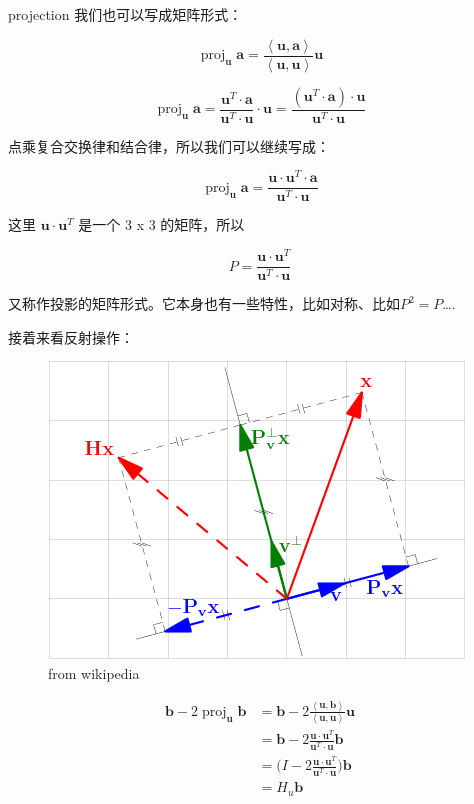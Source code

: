 \documentclass[
]{book}
\begin{document}
projection 我们也可以写成矩阵形式：

\[\operatorname {proj} _{\mathbf {u} }\mathbf {a} ={\frac {\left\langle \mathbf {u} ,\mathbf {a} \right\rangle }{\left\langle \mathbf {u} ,\mathbf {u} \right\rangle }}{\mathbf {u} }\]

\[
\operatorname {proj} _{\mathbf {u} }\mathbf {a} = {\frac  {\mathbf {u}^T \cdot \mathbf {a} }{\mathbf {u}^T \cdot \mathbf {u} }} \cdot  {\mathbf {u} }  =  {\frac  { (\mathbf {u}^T \cdot \mathbf {a})  \cdot \mathbf {u}  }{\mathbf {u}^T \cdot \mathbf {u} }}
\]

点乘复合交换律和结合律，所以我们可以继续写成：

\[
\operatorname {proj} _{\mathbf {u} }\mathbf {a} =  {\frac  { \mathbf {u}\cdot \mathbf {u}^T  \cdot \mathbf {a}  }{\mathbf {u}^T \cdot \mathbf {u} }}
\]

这里 \(\mathbf {u}\cdot \mathbf {u}^T\) 是一个 3 x 3 的矩阵，所以

\[
P =  {\frac  { \mathbf {u}\cdot \mathbf {u}^T  }{\mathbf {u}^T \cdot \mathbf {u} }}
\]

又称作投影的矩阵形式。它本身也有一些特性，比如对称、比如\(P^2 = P\)\ldots.

接着来看反射操作：

\begin{figure}
\centering
\includegraphics{images/QR_02_HouseholderReflection.png}
\caption{from wikipedia}
\end{figure}

\[
\begin{aligned}
\mathbf {b} - 2 \operatorname {proj} _{\mathbf {u} }\mathbf {b} {}
&= \mathbf {b} - 2 {\frac {\left\langle \mathbf {u} ,\mathbf {b} \right\rangle }{\left\langle \mathbf {u} ,\mathbf {u} \right\rangle }}{\mathbf {u} } \\
&= \mathbf {b} - 2 {\frac  { \mathbf {u}\cdot \mathbf {u}^T  }{\mathbf {u}^T \cdot \mathbf {u} }} \mathbf{b}\\
&=  ( I - 2 {\frac  { \mathbf {u}\cdot \mathbf {u}^T  }{\mathbf {u}^T \cdot \mathbf {u} })} \mathbf{b}\\
&= H_u\mathbf{b} 
\end{aligned}
\]
\end{document}
